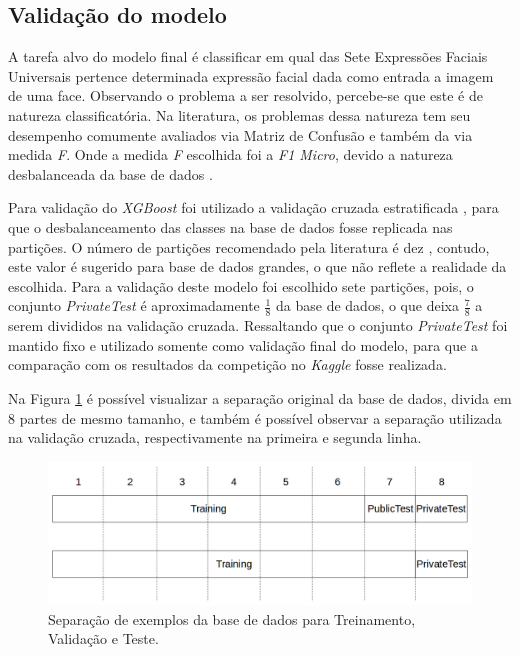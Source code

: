 \subsection{Validação do modelo}
A tarefa alvo do modelo final é classificar em qual das Sete Expressões Faciais Universais pertence determinada expressão facial dada como entrada a imagem de uma face. Observando o problema a ser resolvido, percebe-se que este é de natureza classificatória. Na literatura, os problemas dessa natureza tem seu desempenho comumente avaliados via Matriz de Confusão e também da via medida \emph{F}. Onde a medida \emph{F} escolhida foi a \emph{F1 Micro}, devido a natureza desbalanceada da base de dados \cite{}.

Para validação do \emph{XGBoost} foi utilizado a validação cruzada estratificada \cite{}, para que o desbalanceamento das classes na base de dados fosse replicada nas partições. O número de partições recomendado pela literatura é dez \cite{}, contudo, este valor é sugerido para base de dados grandes, o que não reflete a realidade da escolhida. Para a validação deste modelo foi escolhido sete partições, pois, o conjunto \emph{PrivateTest} é aproximadamente $\frac{1}{8}$ da base de dados, o que deixa $\frac{7}{8}$ a serem divididos na validação cruzada. Ressaltando que o conjunto \emph{PrivateTest} foi mantido fixo e utilizado somente como validação final do modelo, para que a comparação com os resultados da competição no \emph{Kaggle} fosse realizada.

Na Figura \ref{fig:datasetSplit} é possível visualizar a separação original da base de dados, divida em 8 partes de mesmo tamanho, e também é possível observar a separação utilizada na validação cruzada, respectivamente na primeira e segunda linha.

\begin{figure}[!htb]
    \centering
    \includegraphics[width=15cm]{images/evaluation.png}
    \caption{Separação de exemplos da base de dados para Treinamento, Validação e Teste.}
    \label{fig:datasetSplit}
\end{figure}